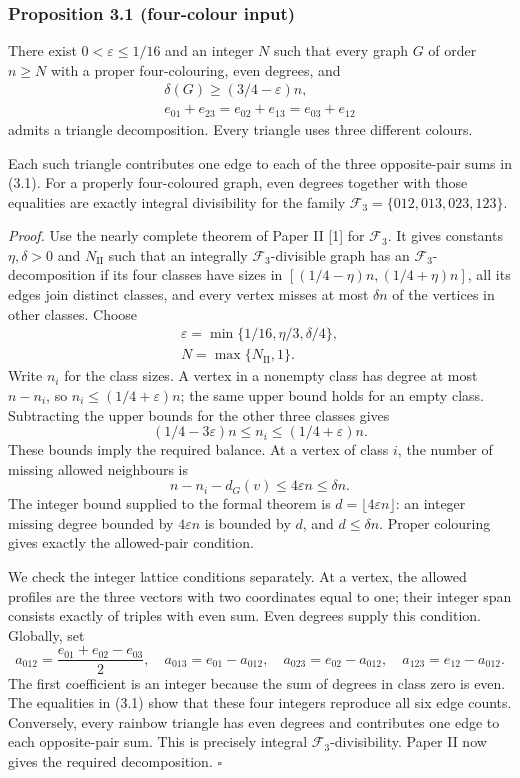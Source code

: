 \documentclass[english,11pt,a4paper]{article}
\newcounter{none}
\begin{document}
\subsubsection{Proposition 3.1 (four-colour input)}\label{proposition-3.1-four-colour-input}

There exist \(0<\varepsilon\le1/16\) and an integer \(N\) such that every graph \(G\) of order \(n\ge N\) with a proper four-colouring, even degrees, and \[\begin{gathered}
\delta(G)\ge(3/4-\varepsilon)n,
\\
e_{01}+e_{23}=e_{02}+e_{13}=e_{03}+e_{12}
\end{gathered}
\tag{3.1}\] admits a triangle decomposition. Every triangle uses three different colours.

Each such triangle contributes one edge to each of the three opposite-pair sums in (3.1). For a properly four-coloured graph, even degrees together with those equalities are exactly integral divisibility for the family \(\mathcal F_3=\{012,013,023,123\}\).

\emph{Proof.} Use the nearly complete theorem of Paper II {[}1{]} for \(\mathcal F_3\). It gives constants \(\eta,\delta>0\) and \(N_{\mathrm{II}}\) such that an integrally \(\mathcal F_3\)-divisible graph has an \(\mathcal F_3\)-decomposition if its four classes have sizes in \([(1/4-\eta)n,(1/4+\eta)n]\), all its edges join distinct classes, and every vertex misses at most \(\delta n\) of the vertices in other classes. Choose \[\begin{gathered}
\varepsilon=\min\{1/16,\eta/3,\delta/4\},\\
N=\max\{N_{\mathrm{II}},1\}.
\end{gathered}\] Write \(n_i\) for the class sizes. A vertex in a nonempty class has degree at most \(n-n_i\), so \(n_i\le(1/4+\varepsilon)n\); the same upper bound holds for an empty class. Subtracting the upper bounds for the other three classes gives \[(1/4-3\varepsilon)n\le n_i\le(1/4+\varepsilon)n.\] These bounds imply the required balance. At a vertex of class \(i\), the number of missing allowed neighbours is \[n-n_i-d_G(v)\le4\varepsilon n\le\delta n.\] The integer bound supplied to the formal theorem is \(d=\lfloor4\varepsilon n\rfloor\): an integer missing degree bounded by \(4\varepsilon n\) is bounded by \(d\), and \(d\le\delta n\). Proper colouring gives exactly the allowed-pair condition.

We check the integer lattice conditions separately. At a vertex, the allowed profiles are the three vectors with two coordinates equal to one; their integer span consists exactly of triples with even sum. Even degrees supply this condition. Globally, set \[a_{012}=\frac{e_{01}+e_{02}-e_{03}}2,\quad
a_{013}=e_{01}-a_{012},\quad
a_{023}=e_{02}-a_{012},\quad
a_{123}=e_{12}-a_{012}.\] The first coefficient is an integer because the sum of degrees in class zero is even. The equalities in (3.1) show that these four integers reproduce all six edge counts. Conversely, every rainbow triangle has even degrees and contributes one edge to each opposite-pair sum. This is precisely integral \(\mathcal F_3\)-divisibility. Paper II now gives the required decomposition. \(\square\)
\end{document}
